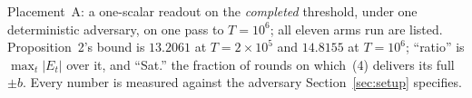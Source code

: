 \begin{table}[!ht]
\centering
\scriptsize
\setlength{\tabcolsep}{4.5pt}
\renewcommand{\arraystretch}{0.95}
\caption{Placement~A: a one-scalar readout on the \emph{completed} threshold, under one
deterministic adversary, on one pass to $T = 10^6$; all eleven arms run are listed.
Proposition~2's bound is $13.2061$ at $T = 2{\times}10^5$ and $14.8155$ at $T = 10^6$;
``ratio'' is $\max_t|E_t|$ over it, and ``Sat.'' the fraction of rounds on which~(4)
delivers its full $\pm b$. Every number is measured against the adversary
Section~\ref{sec:setup} specifies.}

\end{table}
